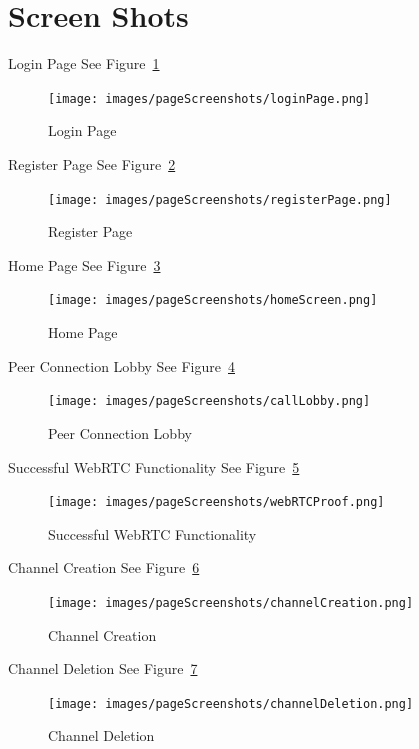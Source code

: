 \section{Screen Shots}
Login Page See Figure~\ref{image:loginPage}
\begin{figure}[h!]
    \caption{Login Page}
    \label{image:loginPage}
    \centering
    \texttt{[image: images/pageScreenshots/loginPage.png]}
\end{figure}

Register Page See Figure~\ref{image:registerPage}
\begin{figure}[h!]
    \caption{Register Page}
    \label{image:registerPage}
    \centering
    \texttt{[image: images/pageScreenshots/registerPage.png]}
\end{figure}

Home Page See Figure~\ref{image:homePage}
\begin{figure}[h!]
    \caption{Home Page}
    \label{image:homePage}
    \centering
    \texttt{[image: images/pageScreenshots/homeScreen.png]}
\end{figure}

Peer Connection Lobby See Figure~\ref{image:peerConnectionLobby}
\begin{figure}[h!]
    \caption{Peer Connection Lobby}
    \label{image:peerConnectionLobby}
    \centering
    \texttt{[image: images/pageScreenshots/callLobby.png]}
\end{figure}

Successful WebRTC Functionality See Figure~\ref{image:webRTCProof}
\begin{figure}[h!]
    \caption{Successful WebRTC Functionality}
    \label{image:webRTCProof}
    \centering
    \texttt{[image: images/pageScreenshots/webRTCProof.png]}
\end{figure}

Channel Creation See Figure~\ref{image:channelCreation}
\begin{figure}[h!]
    \caption{Channel Creation}
    \label{image:channelCreation}
    \centering
    \texttt{[image: images/pageScreenshots/channelCreation.png]}
\end{figure}

Channel Deletion See Figure~\ref{image:channelDeletion}
\begin{figure}[h!]
    \caption{Channel Deletion}
    \label{image:channelDeletion}
    \centering
    \texttt{[image: images/pageScreenshots/channelDeletion.png]}
\end{figure}


